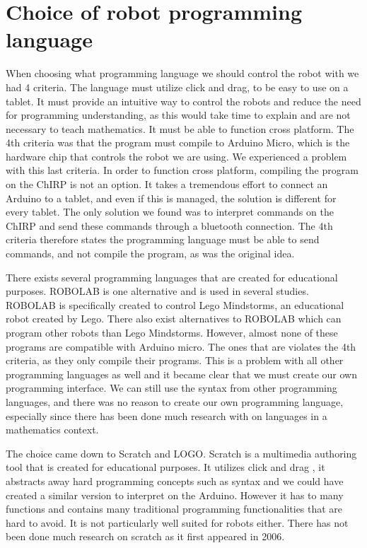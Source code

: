\chapter{Choice of robot programming language}
When choosing what programming language we should control the robot with we had 4 criteria. The language must utilize click and drag, to be easy to use on a tablet. It must provide an intuitive way to control the robots and reduce the need for programming understanding, as this would take time to explain and are not necessary to teach mathematics. It must be able to function cross platform. The 4th criteria was that the program must compile to Arduino Micro, which is the hardware chip that controls the robot we are using. We experienced a problem with this last criteria. In order to function cross platform, compiling the program on the ChIRP is not an option. It takes a tremendous effort to connect an Arduino to a tablet, and even if this is managed, the solution is different for every tablet. The only solution we found was to interpret commands on the ChIRP and send these commands through a bluetooth connection. The 4th criteria therefore states the programming language must be able to send commands, and not compile the program, as was the original idea.

\bigskip\noindent
There exists several programming languages that are created for educational purposes. ROBOLAB is one alternative and is used in several studies. ROBOLAB is specifically created to control Lego Mindstorms, an educational robot created by Lego. There also exist alternatives to ROBOLAB which can program other robots than Lego Mindstorms. However, almost none of these programs are compatible with Arduino micro. The ones that are violates the 4th criteria, as they only compile their programs. This is a problem with all other programming languages as well and it became clear that we must create our own programming interface. We can still use the syntax from other programming languages, and there was no reason to create our own programming language, especially since there has been done much research with on languages in a mathematics context.

\bigskip\noindent
The choice came down to Scratch and LOGO. Scratch is a multimedia authoring tool that is created for educational purposes. It utilizes click and drag , it abstracts away hard programming concepts such as syntax and we could have created a similar version to interpret on the Arduino. However it has to many functions and contains many traditional programming functionalities that are hard to avoid. It is not particularly well suited for robots either. There has not been done much research on scratch as it first appeared in 2006.

